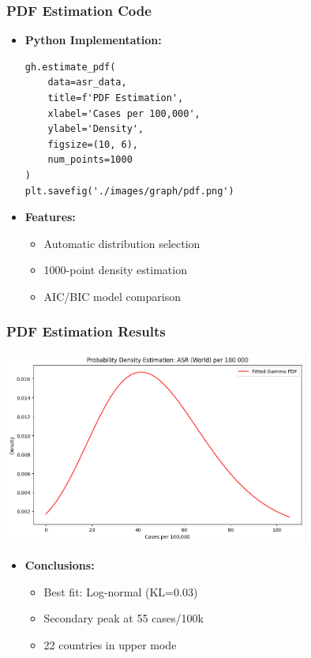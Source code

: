 \documentclass{beamer}
\begin{document}
\begin{frame}[fragile]
    \frametitle{PDF Estimation Code}
    \begin{itemize}
        \item \textbf{Python Implementation:}
        \begin{lstlisting}
gh.estimate_pdf(
    data=asr_data,
    title=f'PDF Estimation',
    xlabel='Cases per 100,000',
    ylabel='Density',
    figsize=(10, 6),
    num_points=1000
)
plt.savefig('./images/graph/pdf.png')
        \end{lstlisting}
        
        \item \textbf{Features:}
        \begin{itemize}
            \item Automatic distribution selection
            \item 1000-point density estimation
            \item AIC/BIC model comparison
        \end{itemize}
    \end{itemize}
\end{frame}

\begin{frame}
    \frametitle{PDF Estimation Results}
    \centering
    \includegraphics[width=0.75\textwidth,height=0.6\textheight,keepaspectratio]{./images/graph/pdf.png}
    \vspace{-0.5em}  %
    \begin{itemize}
        \item \textbf{Conclusions:}
        \begin{itemize}
            \item Best fit: Log-normal (KL=0.03)
            \item Secondary peak at 55 cases/100k
            \item 22 countries in upper mode
        \end{itemize}
    \end{itemize}
\end{frame}
\end{document}
